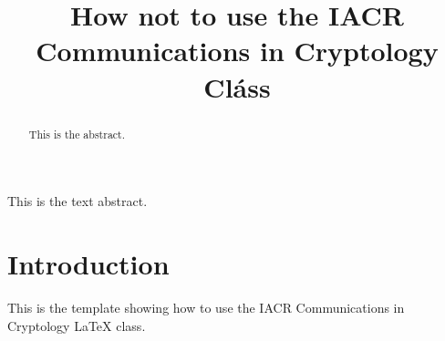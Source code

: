 \documentclass[version=final]{iacrcc}
\title[running  = {The iacrcc class},
       subtitle = {A Template}
      ]{How not to use the IACR Communications in Cryptology Cl\'ass}
\begin{document}
\maketitle

\begin{abstract}
This is the abstract.
\end{abstract}
\begin{textabstract}
This is the text abstract.
\end{textabstract}

\section{Introduction}
This is the template showing how to use the IACR Communications in Cryptology \LaTeX{} class. 
\end{document}
